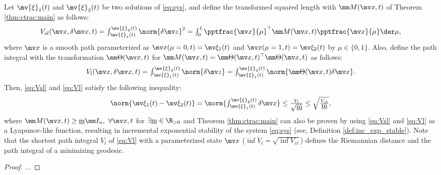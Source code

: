 \begin{theorem}
    Let $\mv{\xi}_1(t)$ and $\mv{\xi}_2(t)$ be two solutions of \eqref{eq:sys}, and define the transformed squared length with $\mm M(\bdx,t)$ of Theorem \ref{thm:ctrac:main} as follows:
    \begin{equation}
        V_{sl}(\bdx,\delta\bdx,t)
        =
        \textstyle\int_{\mv{\xi}_1(t)}^{\mv{\xi}_2(t)}
        \norm{\delta\bdz}^2
        =
        \textstyle\int_0^1
        \pptfrac{\bdx}{\mu}^\top
        \mm M(\bdx,t)
        \pptfrac{\bdx}{\mu}
        \der\mu
        ,
        \label{eq:Vsl}
    \end{equation}
    where $\bdx$ is a smooth path parameterized as $\bdx(\mu=0,t)=\mv\xi_1(t)$ and $\bdx(\mu=1,t)=\mv\xi_2(t)$ by $\mu\in\{0,1\}$.
    Also, define the path integral with the transformation $\mm\Theta(\bdx,t)$ for $\mm M(\bdx,t)=\mm\Theta(\bdx,t)^\top\mm\Theta(\bdx,t)$ as follows:
    \begin{equation}
        V_{l}(\bdx,\delta\bdx,t)
        =
        \textstyle\int_{\mv{\xi}_1(t)}^{\mv{\xi}_2(t)}
        \norm{\delta\bdz}
        =
        \textstyle\int_{\mv{\xi}_1(t)}^{\mv{\xi}_2(t)}
        \norm{\mm\Theta(\bdx,t)\delta\bdx}
        .
        \label{eq:Vl}
    \end{equation}
    Then, \eqref{eq:Vsl} and \eqref{eq:Vl} satisfy the following inequality:
    \begin{equation}
        \norm{\mv\xi_1(t)-\mv\xi_2(t)}
        =
        \norm{
            \textstyle\int_{\mv{\xi}_1(t)}^{\mv{\xi}_2(t)}
            \delta\bdx
        }
        \le
        \tfrac{V_{l}}{\sqrt{\underbar{m}}}
        \le
        \sqrt{\tfrac{V_{sl}}{\underbar{m}}}
        ,
    \end{equation}
    where $\mm M(\bdx,t) \ge \underbar{m}\mm I_n,\ \forall \bdx, t$ for $\exists\underbar{m}\in\R_{>0}$ and Theorem \ref{thm:ctrac:main} can also be proven by using \eqref{eq:Vsl} and \eqref{eq:Vl} as a Lyapunov-like function, resulting in incremental exponential stability of the system \eqref{eq:sys} (see, Definition \ref{def:inc_exp_stable}).
    Note that the shortest path integral $V_l$ of \eqref{eq:Vl} with a parameterized state $\bdx$ (\ie $\inf{V_l}=\sqrt{\inf{V_{sl}}}$) defines the Riemannian distance and the path integral of a minimizing geodesic.
\end{theorem}

\begin{proof}
    ...
\end{proof}

